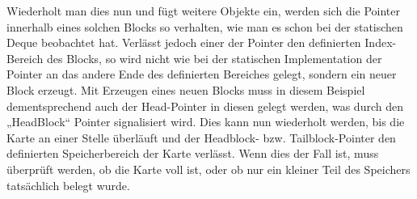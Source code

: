 \documentclass{TUBAFarbeiten}
\begin{document}
Wiederholt man dies nun und fügt weitere Objekte ein, werden sich die Pointer innerhalb eines solchen Blocks so verhalten, wie man es schon bei der statischen Deque beobachtet hat. Verlässt jedoch einer der Pointer den definierten Index-Bereich des Blocks, so wird nicht wie bei der statischen Implementation der Pointer an das andere Ende des definierten Bereiches gelegt, sondern ein neuer Block erzeugt. Mit Erzeugen eines neuen Blocks muss in diesem Beispiel dementsprechend auch der Head-Pointer in diesen gelegt werden, was durch den „HeadBlock“ Pointer signalisiert wird. Dies kann nun wiederholt werden, bis die Karte an einer Stelle überläuft und der Headblock- bzw. Tailblock-Pointer den definierten Speicherbereich der Karte verlässt. Wenn dies der Fall ist, muss überprüft werden, ob die Karte voll ist, oder ob nur ein kleiner Teil des Speichers tatsächlich belegt wurde. 
\end{document}

